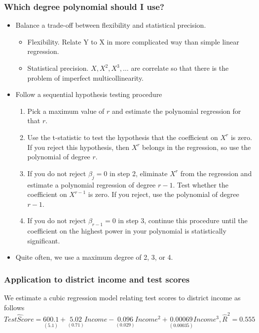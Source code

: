 \documentclass[a4paper,11pt]{article}
\begin{document}
\subsubsection*{Which degree polynomial should I use?}
\label{sec:org207c0cb}
\begin{itemize}
\item Balance a trade-off between flexibility and statistical precision.
\begin{itemize}
\item Flexibility. Relate Y to X in more complicated way than simple
linear regression.
\item Statistical precision. \(X, X^2, X^3, \ldots\) are correlate so
that there is the problem of imperfect multicollinearity.
\end{itemize}
\item Follow a sequential hypothesis testing procedure
\begin{enumerate}
\item Pick a maximum value of \(r\) and estimate the polynomial
regression for that \(r\).
\item Use the t-statistic to test the hypothesis that the coefficient
on \(X^r\) is zero. If you reject this hypothesis, then \(X^r\)
belongs in the regression, so use the polynomial of degree \(r\).
\item If you do not reject \(\beta_j = 0\) in step 2, eliminate \(X^r\)
from the regression and estimate a polynomial regression of
degree \(r-1\). Test whether the coefficient on \(X^{r-1}\) is
zero. If you reject, use the polynomial of degree \(r-1\).
\item If you do not reject \(\beta_{r-1} = 0\) in step 3, continue this
procedure until the coefficient on the highest power in your
polynomial is statistically significant.
\end{enumerate}
\item Quite often, we use a maximum degree of 2, 3, or 4.
\end{itemize}

\subsubsection*{Application to district income and test scores}
\label{sec:org7ce0f56}
We estimate a cubic regression model relating test scores to district
income as follows
\begin{equation*}
\widehat{TestScore} = \underset{\displaystyle (5.1)}{600.1}
                    + \underset{\displaystyle (0.71)}{5.02} Income
                    - \underset{\displaystyle (0.029)}{0.096} Income^2
                    + \underset{\displaystyle (0.00035)}{0.00069} Income^3, \hat{R}^2 = 0.555
\end{equation*}
\end{document}

